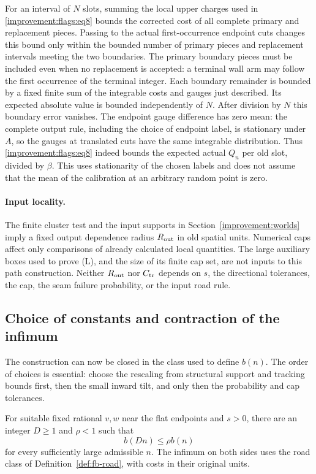 For an interval of $N$ slots, summing the local upper charges used in
\eqref{improvement:flags:eq8} bounds the corrected cost of all complete
primary and replacement pieces. Passing to the actual first-occurrence
endpoint cuts changes this bound only within the bounded number of
primary pieces and replacement intervals meeting the two boundaries.
The primary boundary pieces must be included even when no replacement
is accepted: a terminal wall arm may follow the first occurrence of
the terminal integer. Each boundary remainder is bounded by a fixed
finite sum of the integrable costs and gauges just described. Its
expected absolute value is bounded independently of $N$.
After division by $N$ this boundary error vanishes. The endpoint gauge
difference has zero mean: the complete output rule, including the
choice of endpoint label, is stationary under $A$, so the gauges at
translated cuts have the same integrable distribution. Thus
\eqref{improvement:flags:eq8} indeed bounds the expected actual $Q_n$
per old slot, divided by $\beta$. This uses stationarity of the chosen
labels and does not assume that the mean of the calibration at an
arbitrary random point is zero.

\paragraph{Input locality.}
The finite cluster test and the input supports in
Section~\ref{improvement:worlds} imply a fixed output dependence
radius $R_{\rm out}$ in old spatial units. Numerical caps affect only
comparisons of already calculated local quantities. The large
auxiliary boxes used to prove (L), and the size of its finite cap set,
are not inputs to this path construction. Neither $R_{\rm out}$ nor
$C_{\rm tr}$ depends on $s$, the directional tolerances, the cap, the
seam failure probability, or the input road rule.

\subsection{Choice of constants and contraction of the infimum}
\label{improvement:contraction}

The construction can now be closed in the class used to define $b(n)$.
The order of choices is essential: choose the rescaling from structural
support and tracking bounds first, then the small inward tilt, and only
then the probability and cap tolerances.

\begin{proposition}
\label{improvement:contraction-proposition}
For suitable fixed rational $v,w$ near the flat endpoints and $s>0$,
there are an integer $D\ge1$ and $\rho<1$ such that
\[
 b(Dn)\le\rho b(n)
\]
for every sufficiently large admissible $n$. The infimum on both sides
uses the road class of Definition~\ref{def:fb-road}, with costs in their
original units.
\end{proposition}

